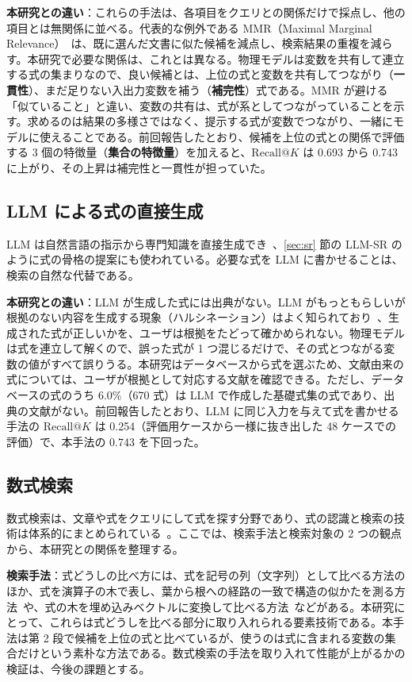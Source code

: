 \documentclass[a4j,dvipdfmx,10pt]{jresume}
\makeatletter
\newcommand{\rk}{\textrm{Recall@}K}
\makeatother
\begin{document}
\textbf{本研究との違い}：これらの手法は、各項目をクエリとの関係だけで採点し、他の項目とは無関係に並べる。代表的な例外である MMR（Maximal Marginal Relevance）~\citep{MMR}は、既に選んだ文書に似た候補を減点し、検索結果の重複を減らす。本研究で必要な関係は、これとは異なる。物理モデルは変数を共有して連立する式の集まりなので、良い候補とは、上位の式と変数を共有してつながり（\textbf{一貫性}）、まだ足りない入出力変数を補う（\textbf{補完性}）式である。MMR が避ける「似ていること」と違い、変数の共有は、式が系としてつながっていることを示す。求めるのは結果の多様さではなく、提示する式が変数でつながり、一緒にモデルに使えることである。前回報告したとおり、候補を上位の式との関係で評価する 3 個の特徴量（\textbf{集合の特徴量}）を加えると、$\rk$ は 0.693 から 0.743 に上がり、その上昇は補完性と一貫性が担っていた。

\subsection{LLM による式の直接生成}\label{sec:llm}
LLM は自然言語の指示から専門知識を直接生成でき~\citep{GPT3}、\ref{sec:sr} 節の LLM-SR のように式の骨格の提案にも使われている。必要な式を LLM に書かせることは、検索の自然な代替である。

\textbf{本研究との違い}：LLM が生成した式には出典がない。LLM がもっともらしいが根拠のない内容を生成する現象（ハルシネーション）はよく知られており~\citep{Hallucination}、生成された式が正しいかを、ユーザは根拠をたどって確かめられない。物理モデルは式を連立して解くので、誤った式が 1 つ混じるだけで、その式とつながる変数の値がすべて誤りうる。本研究はデータベースから式を選ぶため、文献由来の式については、ユーザが根拠として対応する文献を確認できる。ただし、データベースの式のうち 6.0\%（670 式）は LLM で作成した基礎式集の式であり、出典の文献がない。前回報告したとおり、LLM に同じ入力を与えて式を書かせる手法の $\rk$ は 0.254（評価用ケースから一様に抜き出した 48 ケースでの評価）で、本手法の 0.743 を下回った。

\subsection{数式検索}\label{sec:mathir}
数式検索は、文章や式をクエリにして式を探す分野であり、式の認識と検索の技術は体系的にまとめられている~\citep{MathSurvey}。ここでは、検索手法と検索対象の 2 つの観点から、本研究との関係を整理する。

\textbf{検索手法}：式どうしの比べ方には、式を記号の列（文字列）として比べる方法のほか、式を演算子の木で表し、葉から根への経路の一致で構造の似かたを測る方法~\citep{Approach0}や、式の木を埋め込みベクトルに変換して比べる方法~\citep{TangentCFT}などがある。本研究にとって、これらは式どうしを比べる部分に取り入れられる要素技術である。本手法は第 2 段で候補を上位の式と比べているが、使うのは式に含まれる変数の集合だけという素朴な方法である。数式検索の手法を取り入れて性能が上がるかの検証は、今後の課題とする。
\end{document}
